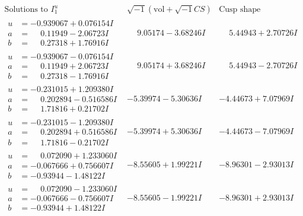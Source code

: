 \documentclass[1p]{elsarticle_modified}
\theoremstyle{definition}
\newcommand{\I}{\sqrt{-1}}
\begin{document}
$$\begin{array}{c|c|c}  
\text{Solutions to }I^u_{1}& \I (\text{vol} + \sqrt{-1}CS) & \text{Cusp shape}\\
 \hline 
\begin{aligned}
u &= -0.939067 + 0.076154 I \\
a &= \phantom{-}0.11949 - 2.06723 I \\
b &= \phantom{-}0.27318 + 1.76916 I\end{aligned}
 & \phantom{-}9.05174 - 3.68246 I & \phantom{-}5.44943 + 2.70726 I \\ \hline\begin{aligned}
u &= -0.939067 - 0.076154 I \\
a &= \phantom{-}0.11949 + 2.06723 I \\
b &= \phantom{-}0.27318 - 1.76916 I\end{aligned}
 & \phantom{-}9.05174 + 3.68246 I & \phantom{-}5.44943 - 2.70726 I \\ \hline\begin{aligned}
u &= -0.231015 + 1.209380 I \\
a &= \phantom{-}0.202894 - 0.516586 I \\
b &= \phantom{-}1.71816 + 0.21702 I\end{aligned}
 & -5.39974 - 5.30636 I & -4.44673 + 7.07969 I \\ \hline\begin{aligned}
u &= -0.231015 - 1.209380 I \\
a &= \phantom{-}0.202894 + 0.516586 I \\
b &= \phantom{-}1.71816 - 0.21702 I\end{aligned}
 & -5.39974 + 5.30636 I & -4.44673 - 7.07969 I \\ \hline\begin{aligned}
u &= \phantom{-}0.072090 + 1.233060 I \\
a &= -0.067666 + 0.756607 I \\
b &= -0.93944 - 1.48122 I\end{aligned}
 & -8.55605 + 1.99221 I & -8.96301 - 2.93013 I \\ \hline\begin{aligned}
u &= \phantom{-}0.072090 - 1.233060 I \\
a &= -0.067666 - 0.756607 I \\
b &= -0.93944 + 1.48122 I\end{aligned}
 & -8.55605 - 1.99221 I & -8.96301 + 2.93013 I \\ \hline\begin{aligned}

\end{aligned}
\end{array}$$
\end{document}
